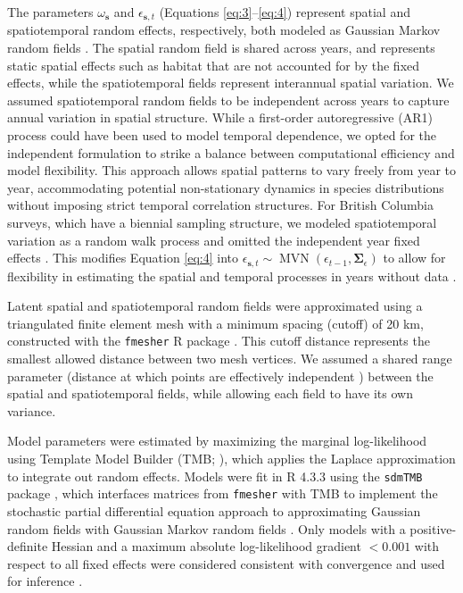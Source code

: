 \documentclass[9pt,twoside,lineno]{pnas-new}
\begin{document}
The parameters \( \omega_{\mathbf{s}} \) and \( \epsilon_{\mathbf{s},t} \) (Equations \ref{eq:3}--\ref{eq:4}) represent spatial and spatiotemporal random effects, respectively, both modeled as Gaussian Markov random fields \citep{LindgrenSPDE2011}. The spatial random field is shared across years, and represents static spatial effects such as habitat that are not accounted for by the fixed effects, while the spatiotemporal fields represent interannual spatial variation. We assumed spatiotemporal random fields to be independent across years to capture annual variation in spatial structure. While a first-order autoregressive (AR1) process could have been used to model temporal dependence, we opted for the independent formulation to strike a balance between computational efficiency and model flexibility. This approach allows spatial patterns to vary freely from year to year, accommodating potential non-stationary dynamics in species distributions without imposing strict temporal correlation structures. For British Columbia surveys, which have a biennial sampling structure, we modeled spatiotemporal variation as a random walk process and omitted the independent year fixed effects \citep{WardWin2024, DavidsonDogfish2026}. This modifies Equation \ref{eq:4} into $\epsilon_{\boldsymbol{s},t} \sim  \operatorname{MVN}(\epsilon_{t-1},\boldsymbol{\Sigma}_{\epsilon})$ to allow for flexibility in estimating the spatial and temporal processes in years without data \citep{WardWin2024, DavidsonDogfish2026}.

Latent spatial and spatiotemporal random fields were approximated using a triangulated finite element mesh with a minimum spacing (cutoff) of 20 km, constructed with the \texttt{fmesher} R package \citep{LindgrenFmesher2025}. This cutoff distance represents the smallest allowed distance between two mesh vertices. We assumed a shared range parameter (distance at which points are effectively independent \citep{LindgrenSPDE2011}) between the spatial and spatiotemporal fields, while allowing each field to have its own variance.

Model parameters were estimated by maximizing the marginal log-likelihood using Template Model Builder (TMB; \citep{KristensenTMB2016}), which applies the Laplace approximation to integrate out random effects. Models were fit in R 4.3.3 \citep{RCoreTeam2021} using the \texttt{sdmTMB} package \citep{sdmTMB_2025}, which interfaces matrices from \texttt{fmesher} with TMB to implement the stochastic partial differential equation approach to approximating Gaussian random fields with Gaussian Markov random fields \citep{LindgrenSPDE2011}. Only models with a positive-definite Hessian and a maximum absolute log-likelihood gradient $< 0.001$ with respect to all fixed effects were considered consistent with convergence and used for inference \citep{sdmTMB_2025}.
\end{document}
